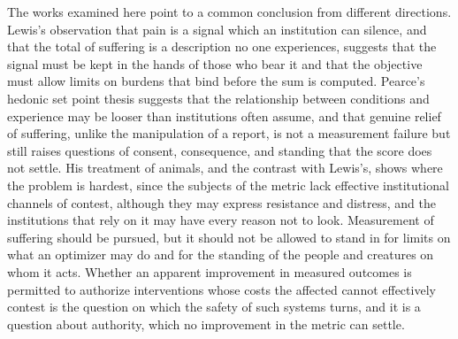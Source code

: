 \documentclass[11pt]{article}
\begin{document}
The works examined here point to a common conclusion from different directions. Lewis's observation that pain is a signal which an institution can silence, and that the total of suffering is a description no one experiences, suggests that the signal must be kept in the hands of those who bear it and that the objective must allow limits on burdens that bind before the sum is computed. Pearce's hedonic set point thesis suggests that the relationship between conditions and experience may be looser than institutions often assume, and that genuine relief of suffering, unlike the manipulation of a report, is not a measurement failure but still raises questions of consent, consequence, and standing that the score does not settle. His treatment of animals, and the contrast with Lewis's, shows where the problem is hardest, since the subjects of the metric lack effective institutional channels of contest, although they may express resistance and distress, and the institutions that rely on it may have every reason not to look. Measurement of suffering should be pursued, but it should not be allowed to stand in for limits on what an optimizer may do and for the standing of the people and creatures on whom it acts. Whether an apparent improvement in measured outcomes is permitted to authorize interventions whose costs the affected cannot effectively contest is the question on which the safety of such systems turns, and it is a question about authority, which no improvement in the metric can settle.
\end{document}

